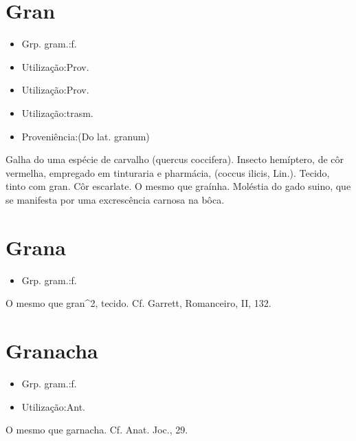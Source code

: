 \section{Gran}
\begin{itemize}
\item {Grp. gram.:f.}
\end{itemize}
\begin{itemize}
\item {Utilização:Prov.}
\end{itemize}
\begin{itemize}
\item {Utilização:Prov.}
\end{itemize}
\begin{itemize}
\item {Utilização:trasm.}
\end{itemize}
\begin{itemize}
\item {Proveniência:(Do lat. \textunderscore granum\textunderscore )}
\end{itemize}
Galha do uma espécie de carvalho (\textunderscore quercus coccifera\textunderscore ).
Insecto hemíptero, de côr vermelha, empregado em tinturaria e pharmácia, (\textunderscore coccus ilicis\textunderscore , Lin.).
Tecido, tinto com gran.
Côr escarlate.
O mesmo que \textunderscore graínha\textunderscore .
Moléstia do gado suino, que se manifesta por uma excrescência carnosa na bôca.
\section{Grana}
\begin{itemize}
\item {Grp. gram.:f.}
\end{itemize}
O mesmo que \textunderscore gran\textunderscore ^2, tecido. Cf. Garrett, \textunderscore Romanceiro\textunderscore , II, 132.
\section{Granacha}
\begin{itemize}
\item {Grp. gram.:f.}
\end{itemize}
\begin{itemize}
\item {Utilização:Ant.}
\end{itemize}
O mesmo que \textunderscore garnacha\textunderscore . Cf. \textunderscore Anat. Joc.\textunderscore , 29.
